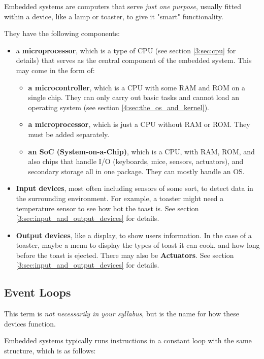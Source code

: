 \documentclass[../main.tex]{subfiles}
\begin{document}
Embedded systems are computers that serve \emph{just one purpose}, usually fitted within a device, like a lamp or toaster, to give it "smart" functionality.

They have the following components:

\begin{itemize}
    \item a \textbf{microprocessor}, which is a type of CPU (see section \ref{3:sec:cpu} for details) that serves as the central component of the embedded system. This may come in the form of:
        \begin{itemize}
            \item \textbf{a microcontroller}, which is a CPU with some RAM and ROM on a single chip. They can only carry out basic tasks and cannot load an operating system (see section \ref{4:sec:the_os_and_kernel}).
            \item \textbf{a microprocessor}, which is just a CPU without RAM or ROM. They must be added separately.
            \item \textbf{an SoC (System-on-a-Chip)}, which is a CPU, with RAM, ROM, and also chips that handle I/O (keyboards, mice, sensors, actuators), and secondary storage all in one package. They can mostly handle an OS.
        \end{itemize}
    \item \textbf{Input devices}, most often including sensors of some sort, to detect data in the surrounding environment. For example, a toaster might need a temperature sensor to see how hot the toast is. See section \ref{3:sec:input_and_output_devices} for details.
    \item \textbf{Output devices}, like a display, to show users information. In the case of a toaster, maybe a menu to display the types of toast it can cook, and how long before the toast is ejected. There may also be \textbf{Actuators}. See section \ref{3:sec:input_and_output_devices} for details.
\end{itemize}

\subsection{Event Loops}

This term is \emph{not necessarily in your syllabus}, but is the name for how these devices function.

Embedded systems typically runs instructions in a constant loop with the same structure, which is as follows:
\end{document}

